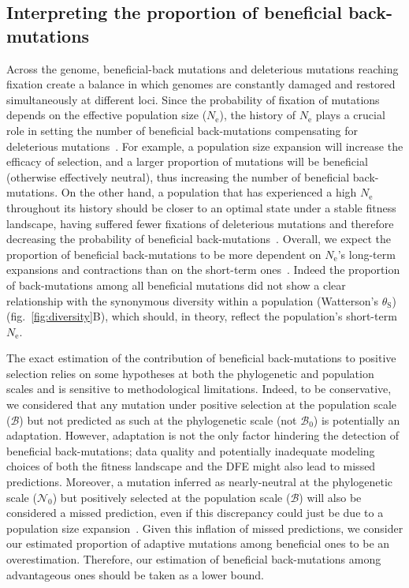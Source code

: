 \documentclass[12pt]{article}
\newcommand{\Ne}{N_{\text{e}}}
\newcommand{\SphyNeu}{\mathcal{N}_0}
\newcommand{\SphyBen}{\mathcal{B}_0}
\newcommand{\SpopBen}{\mathcal{B}}
\newcommand{\thetaSyn}{\theta_{\text{S}}}
\begin{document}
\subsection*{Interpreting the proportion of beneficial back-mutations}

Across the genome, beneficial-back mutations and deleterious mutations reaching fixation create a balance in which genomes are constantly damaged and restored simultaneously at different loci.
Since the probability of fixation of mutations depends on the effective population size ($\Ne$), the history of $\Ne$ plays a crucial role in setting the number of beneficial back-mutations compensating for deleterious mutations~\cite{latrille_inferring_2021}.
For example, a population size expansion will increase the efficacy of selection, and a larger proportion of mutations will be beneficial (otherwise effectively neutral), thus increasing the number of beneficial back-mutations.
On the other hand, a population that has experienced a high $\Ne$ throughout its history should be closer to an optimal state under a stable fitness landscape, having suffered fewer fixations of deleterious mutations and therefore decreasing the probability of beneficial back-mutations~\cite{huber_determining_2017}.
Overall, we expect the proportion of beneficial back-mutations to be more dependent on $\Ne$’s long-term expansions and contractions than on the short-term ones~\cite{charlesworth_other_2007,huber_determining_2017}.
Indeed the proportion of back-mutations among all beneficial mutations did not show a clear relationship with the synonymous diversity within a population (Watterson's $\thetaSyn$) (fig.~\ref{fig:diversity}B), which should, in theory, reflect the population's short-term $\Ne$.

The exact estimation of the contribution of beneficial back-mutations to positive selection relies on some hypotheses at both the phylogenetic and population scales and is sensitive to methodological limitations.
Indeed, to be conservative, we considered that any mutation under positive selection at the population scale ($\SpopBen$) but not predicted as such at the phylogenetic scale (not $\SphyBen$) is potentially an adaptation.
However, adaptation is not the only factor hindering the detection of beneficial back-mutations; data quality and potentially inadequate modeling choices of both the fitness landscape and the DFE might also lead to missed predictions.
Moreover, a mutation inferred as nearly-neutral at the phylogenetic scale ($\SphyNeu$) but positively selected at the population scale ($\SpopBen$) will also be considered a missed prediction, even if this discrepancy could just be due to a population size expansion~\cite{lanfear_population_2014, jones_shifting_2017, platt_protein_2018}.
Given this inflation of missed predictions, we consider our estimated proportion of adaptive mutations among beneficial ones to be an overestimation.
Therefore, our estimation of beneficial back-mutations among advantageous ones should be taken as a lower bound.
\end{document}
